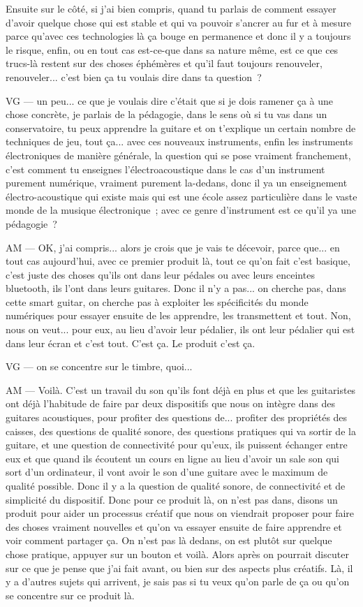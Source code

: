 Ensuite sur le côté, si j'ai bien compris, quand tu parlais de comment essayer d'avoir quelque chose qui est stable et qui va pouvoir s'ancrer au fur et à mesure parce qu'avec ces technologies là ça bouge en permanence et donc il y a toujours le risque, enfin, ou en tout cas est-ce-que dans sa nature même, est ce que ces trucs-là restent sur des choses éphémères et qu'il faut toujours renouveler, renouveler... c'est bien ça tu voulais dire dans ta question ?

VG —  un peu... ce que je voulais dire c'était que si je dois ramener ça à une chose concrète, je parlais de la pédagogie, dans le sens où si tu vas dans un conservatoire, tu peux apprendre la guitare et on t'explique un certain nombre de techniques de jeu, tout ça... avec ces nouveaux instruments, enfin les instruments électroniques de manière générale, la question qui se pose vraiment franchement, c'est comment tu enseignes l'électroacoustique dans le cas d'un instrument purement numérique, vraiment purement la-dedans, donc il ya un enseignement électro-acoustique qui existe mais qui est une école assez particulière dans le vaste monde de la musique électronique ; avec ce genre d'instrument est ce qu'il ya une pédagogie ?

AM — OK, j'ai compris... alors je crois que je vais te décevoir, parce que... en tout cas aujourd'hui, avec ce premier produit là, tout ce qu'on fait c'est basique, c'est juste des choses qu'ils ont dans leur pédales ou avec leurs enceintes bluetooth, ils l'ont dans leurs guitares. Donc il n'y a pas... on cherche pas, dans cette smart guitar, on cherche pas à exploiter les spécificités du monde numériques pour essayer ensuite de les apprendre, les transmettent et tout. Non, nous on veut... pour eux, au lieu d'avoir leur pédalier, ils ont leur pédalier qui est dans leur écran et c'est tout. C'est ça. Le produit c'est ça. 

VG — on se concentre sur le timbre, quoi... 

AM —  Voilà. C'est un travail du son qu'ils font déjà en plus et que les guitaristes ont déjà l'habitude de faire par deux dispositifs que nous on intègre dans des guitares acoustiques, pour profiter des questions de... profiter des propriétés des caisses, des questions de qualité sonore, des questions pratiques qui va sortir de la guitare, et une question de connectivité pour qu'eux, ils puissent échanger entre eux et que quand ils écoutent un cours en ligne au lieu d'avoir un sale son qui sort d'un ordinateur, il vont avoir le son d'une guitare avec le maximum de qualité possible. Donc il y a la question de qualité sonore, de connectivité et de simplicité du dispositif. Donc pour ce produit là, on n'est pas dans, disons un produit pour aider un processus créatif que nous on viendrait proposer pour faire des choses vraiment nouvelles et qu'on va essayer ensuite de faire apprendre et voir comment partager ça. On n'est pas là dedans, on est plutôt sur quelque chose pratique, appuyer sur un bouton et voilà. Alors après on pourrait discuter sur ce que je pense que j'ai fait avant, ou bien sur des aspects plus créatifs. Là, il y a d'autres sujets qui arrivent, je sais pas si tu veux qu'on parle de ça ou qu'on se concentre sur ce produit là. 

